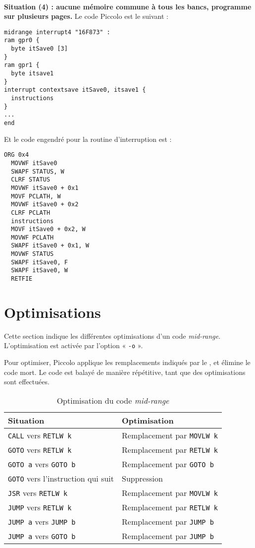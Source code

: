 ~\\
\textbf{Situation (4) : aucune mémoire commune à tous les bancs, programme sur plusieurs pages.} Le code Piccolo est le suivant :
\begin{lstlisting}[language=piccolo]
midrange interrupt4 "16F873" :
ram gpr0 {
  byte itSave0 [3]
}
ram gpr1 {
  byte itsave1
}
interrupt contextsave itSave0, itsave1 {
  instructions
}
...
end
\end{lstlisting}

Et le code engendré pour la routine d'interruption est :
\begin{lstlisting}[language=assembleur]
  ORG 0x4
  MOVWF itSave0
  SWAPF STATUS, W
  CLRF STATUS
  MOVWF itSave0 + 0x1
  MOVF PCLATH, W
  MOVWF itSave0 + 0x2
  CLRF PCLATH
  instructions
  MOVF itSave0 + 0x2, W
  MOVWF PCLATH
  SWAPF itSave0 + 0x1, W
  MOVWF STATUS
  SWAPF itSave0, F
  SWAPF itSave0, W
  RETFIE\end{lstlisting}








\section{Optimisations}

Cette section indique les différentes optimisations d'un code \emph{mid-range}. L'optimisation est activée par l'option « \texttt{-o} ».

Pour optimiser, Piccolo applique les remplacements indiqués par le , et élimine le code mort. Le code est balayé de manière répétitive, tant que des optimisations sont effectuées.

\begin{table}[!ht]
  \centering
  \small
  \begin{tabular}{ll}
    \textbf{Situation} & \textbf{Optimisation} \\
    \hline
    \texttt{CALL} vers \texttt{RETLW k}  & Remplacement par \texttt{MOVLW k}\\
    \texttt{GOTO} vers \texttt{RETLW k}  & Remplacement par \texttt{RETLW k}\\
    \texttt{GOTO a} vers \texttt{GOTO b}  & Remplacement par \texttt{GOTO b}\\
    \texttt{GOTO} vers l'instruction qui suit  & Suppression\\
    \texttt{JSR} vers \texttt{RETLW k}  & Remplacement par \texttt{MOVLW k}\\
    \texttt{JUMP} vers \texttt{RETLW k}  & Remplacement par \texttt{RETLW k}\\
    \texttt{JUMP a} vers \texttt{JUMP b}  & Remplacement par \texttt{JUMP b}\\
    \texttt{JUMP a} vers \texttt{GOTO b}  & Remplacement par \texttt{JUMP b}\\
    \hline
  \end{tabular}
  \caption{Optimisation du code \emph{mid-range}}
\end{table}




